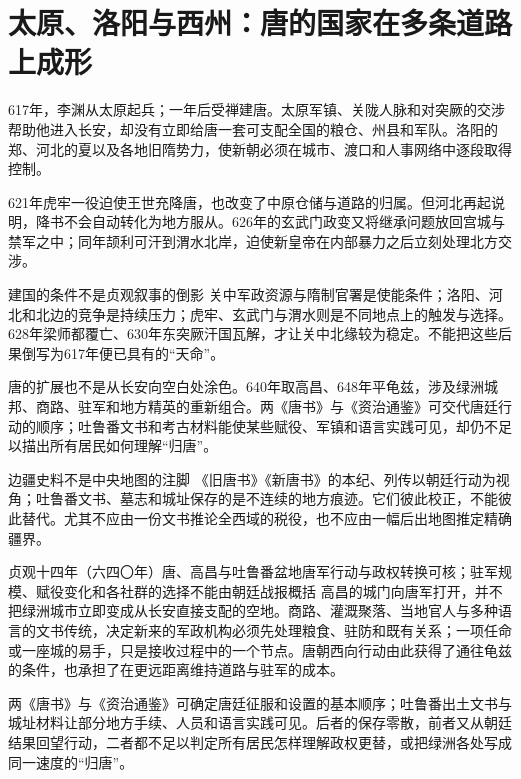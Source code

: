 \section{太原、洛阳与西州：唐的国家在多条道路上成形}
\label{sec:tang-curated-chronicle}

617年，李渊从太原起兵；一年后受禅建唐。太原军镇、关陇人脉和对突厥的交涉帮助他进入长安，却没有立即给唐一套可支配全国的粮仓、州县和军队。洛阳的郑、河北的夏以及各地旧隋势力，使新朝必须在城市、渡口和人事网络中逐段取得控制。

621年虎牢一役迫使王世充降唐，也改变了中原仓储与道路的归属。但河北再起说明，降书不会自动转化为地方服从。626年的玄武门政变又将继承问题放回宫城与禁军之中；同年颉利可汗到渭水北岸，迫使新皇帝在内部暴力之后立刻处理北方交涉。

\begin{causalchain}{建国的条件不是贞观叙事的倒影}
关中军政资源与隋制官署是使能条件；洛阳、河北和北边的竞争是持续压力；虎牢、玄武门与渭水则是不同地点上的触发与选择。628年梁师都覆亡、630年东突厥汗国瓦解，才让关中北缘较为稳定。不能把这些后果倒写为617年便已具有的“天命”。
\end{causalchain}

唐的扩展也不是从长安向空白处涂色。640年取高昌、648年平龟兹，涉及绿洲城邦、商路、驻军和地方精英的重新组合。两《唐书》与《资治通鉴》可交代唐廷行动的顺序；吐鲁番文书和考古材料能使某些赋役、军镇和语言实践可见，却仍不足以描出所有居民如何理解“归唐”。

\begin{sourcenote}{边疆史料不是中央地图的注脚}
《旧唐书》《新唐书》的本纪、列传以朝廷行动为视角；吐鲁番文书、墓志和城址保存的是不连续的地方痕迹。它们彼此校正，不能彼此替代。尤其不应由一份文书推论全西域的税役，也不应由一幅后出地图推定精确疆界。
\end{sourcenote}

\begin{event}{}{贞观十四年（六四〇年）}{唐、高昌与吐鲁番盆地}{唐军行动与政权转换可核；驻军规模、赋役变化和各社群的选择不能由朝廷战报概括}
高昌的城门向唐军打开，并不把绿洲城市立即变成从长安直接支配的空地。商路、灌溉聚落、当地官人与多种语言的文书传统，决定新来的军政机构必须先处理粮食、驻防和既有关系；一项任命或一座城的易手，只是接收过程中的一个节点。唐朝西向行动由此获得了通往龟兹的条件，也承担了在更远距离维持道路与驻军的成本。

两《唐书》与《资治通鉴》可确定唐廷征服和设置的基本顺序；吐鲁番出土文书与城址材料让部分地方手续、人员和语言实践可见。后者的保存零散，前者又从朝廷结果回望行动，二者都不足以判定所有居民怎样理解政权更替，或把绿洲各处写成同一速度的“归唐”。
\end{event}

